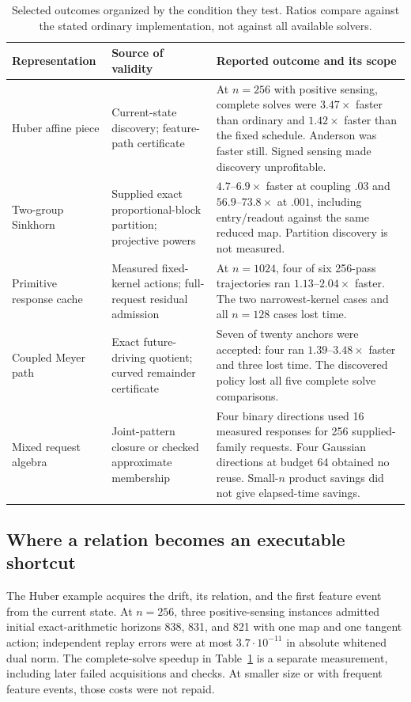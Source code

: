 \documentclass[journal]{IEEEtran}
\theoremstyle{definition}
\begin{document}
\begin{table}[t]
\centering\small
\caption{Selected outcomes organized by the condition they test. Ratios compare
against the stated ordinary implementation, not against all available solvers.}
\label{tab:regimes}
\begin{tabular}{p{}p{}p{}}
\toprule
Representation & Source of validity & Reported outcome and its scope\\\midrule
Huber affine piece & Current-state discovery; feature-path certificate &
At $n=256$ with positive sensing, complete solves were $3.47\times$ faster
than ordinary and $1.42\times$ faster than the fixed schedule. Anderson was
faster still. Signed sensing made discovery unprofitable.\\[3pt]
Two-group Sinkhorn & Supplied exact proportional-block partition;
projective powers & $4.7$--$6.9\times$ faster at coupling $.03$ and
$56.9$--$73.8\times$ at $.001$, including entry/readout against the same
reduced map. Partition discovery is not measured.\\[3pt]
Primitive response cache & Measured fixed-kernel actions; full-request
residual admission & At $n=1024$, four of six 256-pass trajectories ran
$1.13$--$2.04\times$ faster. The two narrowest-kernel cases and all $n=128$
cases lost time.\\[3pt]
Coupled Meyer path & Exact future-driving quotient; curved remainder
certificate & Seven of twenty anchors were accepted: four ran $1.39$--$3.48\times$
faster and three lost time. The discovered policy lost all five complete
solve comparisons.\\[3pt]
Mixed request algebra & Joint-pattern closure or checked approximate
membership & Four binary directions used 16 measured responses for 256
supplied-family requests. Four Gaussian directions at budget 64 obtained no
reuse. Small-$n$ product savings did not give elapsed-time savings.\\
\bottomrule
\end{tabular}
\end{table}

\subsection{Where a relation becomes an executable shortcut}
The Huber example acquires the drift, its relation, and the first feature
event from the current state. At $n=256$, three positive-sensing instances
admitted initial exact-arithmetic horizons 838, 831, and 821 with one map
and one tangent action; independent replay errors were at most
$3.7\cdot10^{-11}$ in absolute whitened dual norm. The complete-solve
speedup in Table~\ref{tab:regimes} is a separate measurement, including
later failed acquisitions and checks. At smaller size or with frequent
feature events, those costs were not repaid.
\end{document}

